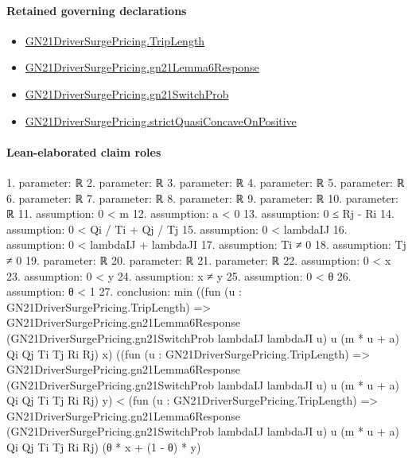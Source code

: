 \documentclass[10pt]{article}
\begin{document}
\paragraph{Retained governing declarations}
\begin{itemize}\raggedright
\item \hyperlink{governing-declaration-a616c143f22cf2bc}{GN21\allowbreak{}Driver\allowbreak{}Surge\allowbreak{}Pricing.\allowbreak{}Trip\allowbreak{}Length}
\item \hyperlink{governing-declaration-068ec7eedec65036}{GN21\allowbreak{}Driver\allowbreak{}Surge\allowbreak{}Pricing.\allowbreak{}gn21\allowbreak{}Lemma6\allowbreak{}Response}
\item \hyperlink{governing-declaration-2506e20884d6eb69}{GN21\allowbreak{}Driver\allowbreak{}Surge\allowbreak{}Pricing.\allowbreak{}gn21\allowbreak{}Switch\allowbreak{}Prob}
\item \hyperlink{governing-declaration-776523ffdc08274c}{GN21\allowbreak{}Driver\allowbreak{}Surge\allowbreak{}Pricing.\allowbreak{}strict\allowbreak{}Quasi\allowbreak{}Concave\allowbreak{}On\allowbreak{}Positive}
\end{itemize}
\paragraph{Lean-elaborated claim roles}\begin{ReviewVerbatim}
1. parameter: ℝ
2. parameter: ℝ
3. parameter: ℝ
4. parameter: ℝ
5. parameter: ℝ
6. parameter: ℝ
7. parameter: ℝ
8. parameter: ℝ
9. parameter: ℝ
10. parameter: ℝ
11. assumption: 0 < m
12. assumption: a < 0
13. assumption: 0 ≤ Rj - Ri
14. assumption: 0 < Qi / Ti + Qj / Tj
15. assumption: 0 < lambdaIJ
16. assumption: 0 < lambdaIJ + lambdaJI
17. assumption: Ti ≠ 0
18. assumption: Tj ≠ 0
19. parameter: ℝ
20. parameter: ℝ
21. parameter: ℝ
22. assumption: 0 < x
23. assumption: 0 < y
24. assumption: x ≠ y
25. assumption: 0 < θ
26. assumption: θ < 1
27. conclusion: min
    ((fun (u : GN21DriverSurgePricing.TripLength) =>
        GN21DriverSurgePricing.gn21Lemma6Response (GN21DriverSurgePricing.gn21SwitchProb lambdaIJ lambdaJI u) u
          (m * u + a) Qi Qj Ti Tj Ri Rj)
      x)
    ((fun (u : GN21DriverSurgePricing.TripLength) =>
        GN21DriverSurgePricing.gn21Lemma6Response (GN21DriverSurgePricing.gn21SwitchProb lambdaIJ lambdaJI u) u
          (m * u + a) Qi Qj Ti Tj Ri Rj)
      y) <
  (fun (u : GN21DriverSurgePricing.TripLength) =>
      GN21DriverSurgePricing.gn21Lemma6Response (GN21DriverSurgePricing.gn21SwitchProb lambdaIJ lambdaJI u) u
        (m * u + a) Qi Qj Ti Tj Ri Rj)
    (θ * x + (1 - θ) * y)
\end{ReviewVerbatim}
\end{document}
